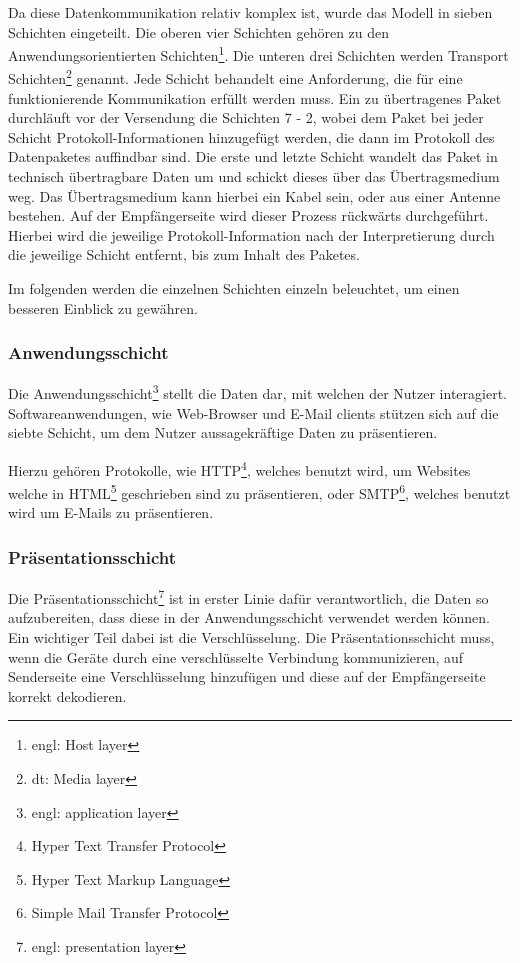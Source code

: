 \documentclass[12pt]{article}
\begin{document}
	Da diese  Datenkommunikation relativ komplex ist, wurde das Modell in sieben Schichten eingeteilt. Die oberen vier Schichten gehören zu den Anwendungsorientierten Schichten\footnote{engl: Host layer}. Die unteren drei Schichten werden Transport Schichten\footnote{dt: Media layer} genannt. Jede Schicht behandelt eine Anforderung, die für eine funktionierende Kommunikation erfüllt werden muss. Ein zu übertragenes Paket durchläuft vor der Versendung die Schichten 7 - 2, wobei dem Paket bei jeder Schicht Protokoll-Informationen hinzugefügt werden, die dann im Protokoll des Datenpaketes auffindbar sind. Die erste und letzte Schicht wandelt das Paket in technisch übertragbare Daten um und schickt dieses über das Übertragsmedium weg. Das Übertragsmedium kann hierbei ein Kabel sein, oder aus einer Antenne bestehen. Auf der Empfängerseite wird dieser Prozess rückwärts durchgeführt. Hierbei wird die jeweilige Protokoll-Information nach der Interpretierung durch die jeweilige Schicht entfernt, bis zum Inhalt des Paketes.
	
	Im folgenden werden die einzelnen Schichten  einzeln beleuchtet, um einen besseren Einblick zu gewähren.

\subsubsection{Anwendungsschicht}
	Die Anwendungsschicht\footnote{engl: application layer} stellt die Daten dar, mit welchen der Nutzer interagiert. Softwareanwendungen, wie Web-Browser und E-Mail clients stützen sich auf die siebte Schicht, um dem Nutzer aussagekräftige Daten zu präsentieren. 
	
	Hierzu gehören Protokolle, wie HTTP\footnote{Hyper Text Transfer Protocol}, welches benutzt wird, um Websites welche in HTML\footnote{Hyper Text Markup Language} geschrieben sind zu präsentieren, oder SMTP\footnote{Simple Mail Transfer Protocol}, welches benutzt wird um E-Mails zu präsentieren.

\subsubsection{Präsentationsschicht}
	Die Präsentationsschicht\footnote{engl: presentation layer} ist in erster Linie dafür verantwortlich, die Daten so aufzubereiten, dass diese in der Anwendungsschicht verwendet werden können. Ein wichtiger Teil dabei ist die Verschlüsselung. Die Präsentationsschicht muss, wenn die Geräte durch eine verschlüsselte Verbindung kommunizieren, auf Senderseite eine Verschlüsselung hinzufügen und diese auf der Empfängerseite korrekt dekodieren. 
	
\end{document}
